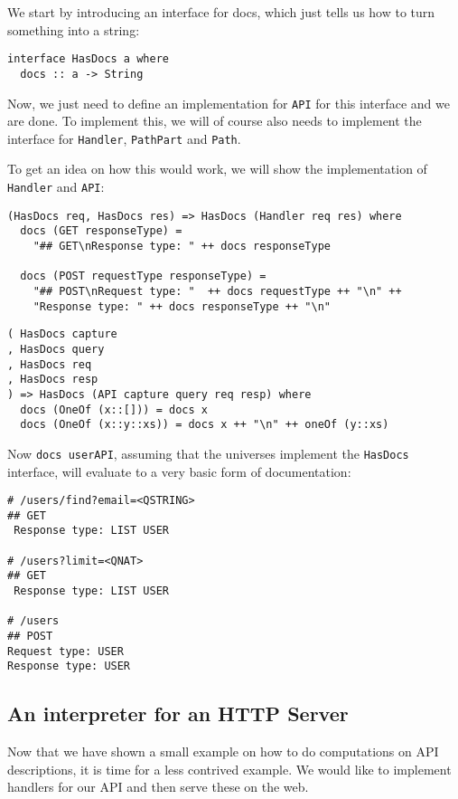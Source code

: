 \documentclass[12pt,a4paper]{article}
\begin{document}
We start by introducing an interface for docs, which just tells us how to turn something into a string:
\begin{verbatim}
interface HasDocs a where
  docs :: a -> String
\end{verbatim}
Now, we just need to define an implementation for \texttt{API} for this interface and we are done. To implement this, we will of course also needs to implement the interface for \texttt{Handler}, \texttt{PathPart} and \texttt{Path}.

To get an idea on how this would work, we will show the implementation of \texttt{Handler} and \texttt{API}:
\begin{verbatim}
(HasDocs req, HasDocs res) => HasDocs (Handler req res) where
  docs (GET responseType) =
    "## GET\nResponse type: " ++ docs responseType

  docs (POST requestType responseType) =
    "## POST\nRequest type: "  ++ docs requestType ++ "\n" ++
    "Response type: " ++ docs responseType ++ "\n"
\end{verbatim}

\begin{verbatim}
( HasDocs capture
, HasDocs query
, HasDocs req
, HasDocs resp
) => HasDocs (API capture query req resp) where
  docs (OneOf (x::[])) = docs x
  docs (OneOf (x::y::xs)) = docs x ++ "\n" ++ oneOf (y::xs)
\end{verbatim}

Now \texttt{docs userAPI}, assuming that the universes implement
the \texttt{HasDocs} interface, will evaluate to a very basic form of documentation:
\begin{verbatim}
# /users/find?email=<QSTRING>
## GET
 Response type: LIST USER

# /users?limit=<QNAT>
## GET
 Response type: LIST USER

# /users
## POST
Request type: USER
Response type: USER

\end{verbatim}

\subsection{An interpreter for an HTTP Server}\label{sec:server}

Now that we have shown a small example on how to do computations on API descriptions,
it is time for a less contrived example. We would like to implement handlers for our API and then serve these on the web. 
\end{document}
